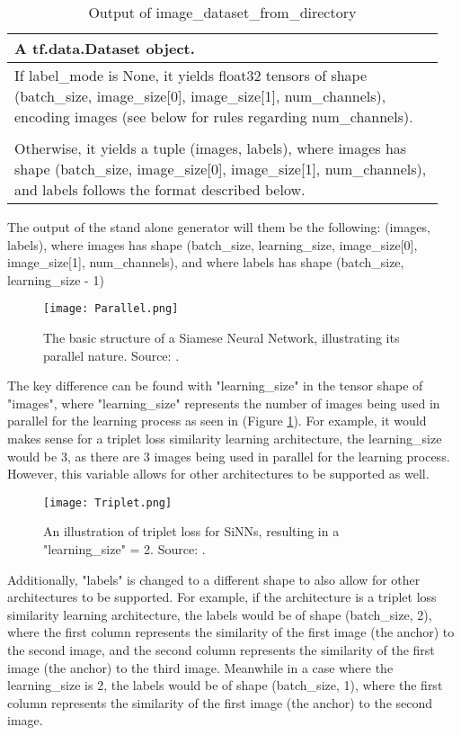 \documentclass[
	letterpaper, %
	10pt, %
	unnumberedsections, %
	twoside, %
]{LTJournalArticle}
\begin{document}
\begin{table}[hbt!] %
	\caption{Output of image\_dataset\_from\_directory}
	\centering
	\begin{tabular}{p{0.95\linewidth}}
		\toprule
		A tf.data.Dataset object. \\
		\midrule
        If label\_mode is None, it yields float32 tensors of shape (batch\_size, image\_size[0], image\_size[1], num\_channels), encoding images (see below for rules regarding num\_channels). \\
        \\
        Otherwise, it yields a tuple (images, labels), where images has shape (batch\_size, image\_size[0], image\_size[1], num\_channels), and labels follows the format described below. \\
		\bottomrule
	\end{tabular}
	\label{tab:output}
\end{table}

The output of the stand alone generator will them be the following: (images, labels), where images has shape (batch\_size, learning\_size, image\_size[0], image\_size[1], num\_channels), and where labels has shape (batch\_size, learning\_size - 1)

\begin{figure} %
	\texttt{[image: Parallel.png]}
	\caption{The basic structure of a Siamese Neural Network, illustrating its parallel nature. Source: \autocite{craeymeersch}.}
	\label{fig:parallel}
\end{figure}

The key difference can be found with "learning\_size" in the tensor shape of "images", where "learning\_size" represents the number of images being used in parallel for the learning process as seen in (Figure \ref{fig:parallel}). For example, it would makes sense for a triplet loss similarity learning architecture, the learning\_size would be 3, as there are 3 images being used in parallel for the learning process. However, this variable allows for other architectures to be supported as well. 

\begin{figure}[hbt!] %
	\texttt{[image: Triplet.png]}
	\caption{An illustration of triplet loss for SiNNs, resulting in a "learning\_size" = 2. Source: \autocite{craeymeersch}.}
	\label{fig:triplet}
\end{figure}

Additionally, "labels" is changed to a different shape to also allow for other architectures to be supported. For example, if the architecture is a triplet loss similarity learning architecture, the labels would be of shape (batch\_size, 2), where the first column represents the similarity of the first image (the anchor) to the second image, and the second column represents the similarity of the first image (the anchor) to the third image. Meanwhile in a case where the learning\_size is 2, the labels would be of shape (batch\_size, 1), where the first column represents the similarity of the first image (the anchor) to the second image.
\end{document}
